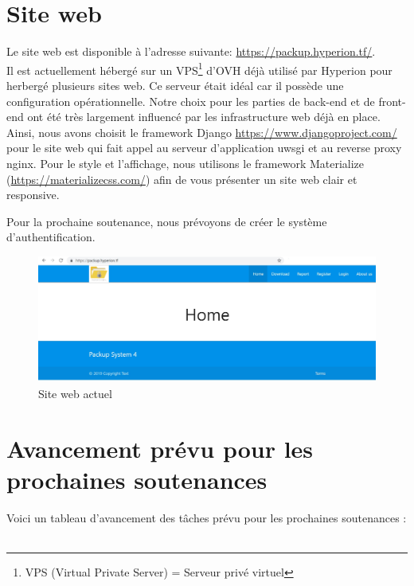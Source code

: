 \newpage

\section{Site web}

    Le site web est disponible à l'adresse suivante: \url{https://packup.hyperion.tf/}. \\
    Il est actuellement hébergé sur un VPS\footnote{VPS (Virtual Private Server) = Serveur privé virtuel} d'OVH déjà utilisé par Hyperion pour herbergé plusieurs sites web. Ce serveur était idéal car il possède une configuration opérationnelle. Notre choix pour les parties de back-end et de front-end ont été très largement influencé par les infrastructure web déjà en place. Ainsi, nous avons choisit le framework Django \url{https://www.djangoproject.com/} pour le site web qui fait appel au serveur d'application uwsgi et au reverse proxy nginx.
    Pour le style et l'affichage, nous utilisons le framework Materialize (\url{https://materializecss.com/}) afin de vous présenter un site web clair et responsive.

    Pour la prochaine soutenance, nous prévoyons de créer le système d'authentification. \\
    
    \begin{figure}[!h]
		\centering
		\includegraphics[width=12.5cm]{images/website.jpg}
		\caption{Site web actuel}
		\label{Site web actuel}
	\end{figure}

\newpage

\section{Avancement prévu pour les prochaines soutenances}
        
        Voici un tableau d'avancement des tâches prévu pour les prochaines soutenances : \\ \\
    
